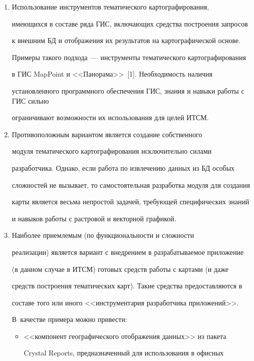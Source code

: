      \begin{enumerate}[1.]


     \item Использование инструментов тематического картографирования, 


имеющихся в составе ряда ГИС, включающих средства построения запросов 


к внешним БД и отображения их результатов на картографической основе. 


Примеры такого подхода~--- инструменты тематического картографирования 


в ГИС MapPoint и <<Панорама>>~[1]. Необходимость наличия 


установленного программного обеспечения ГИС, знания и навыки работы с ГИС сильно 


ограничивают возможности их использования для целей ИТСМ.


     \item Противоположным вариантом является создание собственного 


модуля тематического картографирования исключительно силами 


разработчика. Однако, если работа по извлечению данных из БД особых 


сложностей не вызывает, то самостоятельная разработка модуля для создания 


карты является весьма непростой задачей, требующей специфических знаний 


и навыков работы с растровой и векторной графикой.


     \item Наиболее приемлемым (по функциональности и сложности 


реализации) является вариант с внедрением в разрабатываемое приложение 


(в данном случае в ИТСМ) готовых средств работы с картами (и даже 


средств по\-стро\-ения тематических карт). Такие средства предоставляются в 


составе того или иного <<инструментария разработчика приложений>>. 


В~качестве примера можно привести:


     \begin{itemize}


     \item <<компонент географического отображения данных>> из пакета 


Crystal Reports, предназначенный для использования в офисных 



\end{itemize}
\end{enumerate}
